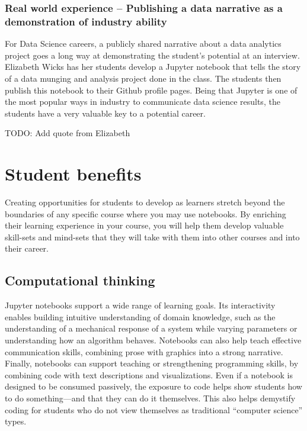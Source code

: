 \documentclass[]{book}
\begin{document}
\subsubsection{Real world experience -- Publishing a data narrative as a
demonstration of industry
ability}\label{real-world-experience-publishing-a-data-narrative-as-a-demonstration-of-industry-ability}

For Data Science careers, a publicly shared narrative about a data
analytics project goes a long way at demonstrating the student's
potential at an interview. Elizabeth Wicks has her students develop a
Jupyter notebook that tells the story of a data munging and analysis
project done in the class. The students then publish this notebook to
their Github profile pages. Being that Jupyter is one of the most
popular ways in industry to communicate data science results, the
students have a very valuable key to a potential career.

TODO: Add quote from Elizabeth

\section{Student benefits}\label{student-benefits}

Creating opportunities for students to develop as learners stretch
beyond the boundaries of any specific course where you may use
notebooks. By enriching their learning experience in your course, you
will help them develop valuable skill-sets and mind-sets that they will
take with them into other courses and into their career.

\subsection{Computational thinking}\label{computational-thinking}

Jupyter notebooks support a wide range of learning goals. Its
interactivity enables building intuitive understanding of domain
knowledge, such as the understanding of a mechanical response of a
system while varying parameters or understanding how an algorithm
behaves. Notebooks can also help teach effective communication skills,
combining prose with graphics into a strong narrative. Finally,
notebooks can support teaching or strengthening programming skills, by
combining code with text descriptions and visualizations. Even if a
notebook is designed to be consumed passively, the exposure to code
helps show students how to do something---and that they can do it
themselves. This also helps demystify coding for students who do not
view themselves as traditional ``computer science'' types.
\end{document}
